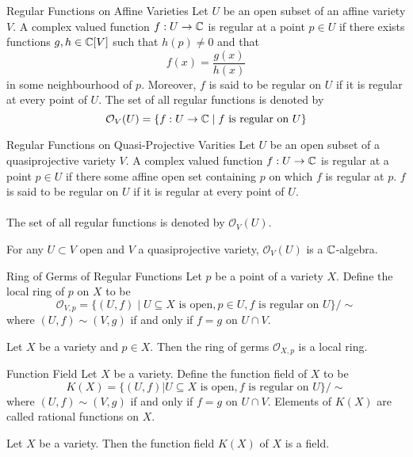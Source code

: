 \documentclass[a4paper]{article}
\begin{document}
\begin{defn}{Regular Functions on Affine Varieties}{} Let $U$ be an open subset of an affine variety $V$. A complex valued function $f:U\to\mathbb{C}$ is regular at a point $p\in U$ if there exists functions $g,h\in\mathbb{C}[V]$ such that $h(p)\neq 0$ and that $$f(x)=\frac{g(x)}{h(x)}$$ in some neighbourhood of $p$. Moreover, $f$ is said to be regular on $U$ if it is regular at every point of $U$. The set of all regular functions is denoted by $$\mathcal{O}_V(U)=\{f:U\to\mathbb{C}\;|\;f\text{ is regular on }U\}$$
\end{defn}

\begin{defn}{Regular Functions on Quasi-Projective Varities}{} Let $U$ be an open subset of a quasiprojective variety $V$. A complex valued function $f:U\to\mathbb{C}$ is regular at a point $p\in U$ if there some affine open set containing $p$ on which $f$ is regular at $p$. 
$f$ is said to be regular on $U$ if it is regular at every point of $U$. \\~\\
The set of all regular functions is denoted by $\mathcal{O}_V(U)$. 
\end{defn}

\begin{lmm}{}{} For any $U\subset V$ open and $V$ a quasiprojective variety, $\mathcal{O}_V(U)$ is a $\mathbb{C}$-algebra. 
\end{lmm}

\begin{defn}{Ring of Germs of Regular Functions}{} Let $p$ be a point of a variety $X$. Define the local ring of $p$ on $X$ to be $$\mathcal{O}_{V,p}=\{(U,f)\;|\;U\subseteq X\text{ is open}, p\in U, f\text{ is regular on }U\}/\sim$$ where $(U,f)\sim(V,g)$ if and only if $f=g$ on $U\cap V$. 
\end{defn}

\begin{prp}{}{} Let $X$ be a variety and $p\in X$. Then the ring of germs $\mathcal{O}_{X,p}$ is a local ring. 
\end{prp}

\begin{defn}{Function Field}{} Let $X$ be a variety. Define the function field of $X$ to be $$K(X)=\{(U,f)|U\subseteq X\text{ is open}, f\text{ is regular on }U\}/\sim$$ where $(U,f)\sim(V,g)$ if and only if $f=g$ on $U\cap V$. Elements of $K(X)$ are called rational functions on $X$. 
\end{defn}

\begin{lmm}{}{} Let $X$ be a variety. Then the function field $K(X)$ of $X$ is a field. 
\end{lmm}
\end{document}
